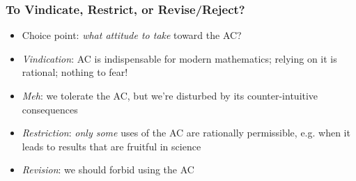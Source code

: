 \begin{frame}
\frametitle{To Vindicate, Restrict, or Revise/Reject?}

\begin{itemize}[<+->]

\item Choice point: \textit{what attitude to take} toward the AC?

\item \emph{Vindication}: AC is indispensable for modern mathematics; relying on it is rational; nothing to fear! 

\item \emph{Meh}: we tolerate the AC, but we're disturbed by its counter-intuitive consequences

\item \emph{Restriction}: \textit{only some} uses of the AC are rationally permissible, e.g. when it leads to results that are fruitful in science 



\item \emph{Revision}: we should forbid using the AC





\end{itemize}
\end{frame}

